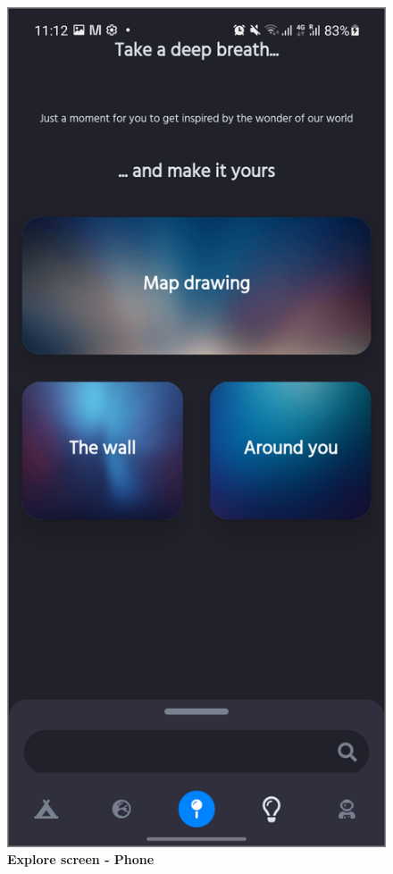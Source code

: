 \begin{figure}[!htb]
\begin{minipage}{.45\textwidth}
\includegraphics[width=.8\textwidth]{../Images/UI/ExploreDark.jpg}
\caption{\label{fig:dbapiuser}\textbf{Explore screen - Phone}}
\end{minipage}
\end{figure} 


